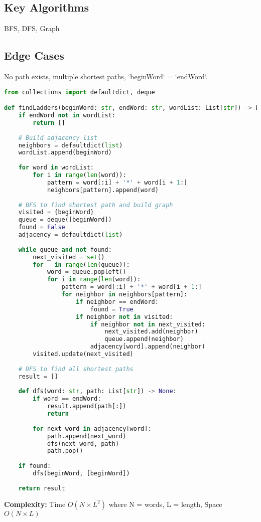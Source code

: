 \documentclass[10pt, a4paper]{article}
\begin{document}
\subsection*{Key Algorithms}
BFS, DFS, Graph

\subsection*{Edge Cases}
No path exists, multiple shortest paths, `beginWord` = `endWord`.

\begin{lstlisting}[language=Python]
from collections import defaultdict, deque

def findLadders(beginWord: str, endWord: str, wordList: List[str]) -> List[List[str]]:
    if endWord not in wordList:
        return []
    
    # Build adjacency list
    neighbors = defaultdict(list)
    wordList.append(beginWord)
    
    for word in wordList:
        for i in range(len(word)):
            pattern = word[:i] + '*' + word[i + 1:]
            neighbors[pattern].append(word)
    
    # BFS to find shortest path and build graph
    visited = {beginWord}
    queue = deque([beginWord])
    found = False
    adjacency = defaultdict(list)
    
    while queue and not found:
        next_visited = set()
        for _ in range(len(queue)):
            word = queue.popleft()
            for i in range(len(word)):
                pattern = word[:i] + '*' + word[i + 1:]
                for neighbor in neighbors[pattern]:
                    if neighbor == endWord:
                        found = True
                    if neighbor not in visited:
                        if neighbor not in next_visited:
                            next_visited.add(neighbor)
                            queue.append(neighbor)
                        adjacency[word].append(neighbor)
        visited.update(next_visited)
    
    # DFS to find all shortest paths
    result = []
    
    def dfs(word: str, path: List[str]) -> None:
        if word == endWord:
            result.append(path[:])
            return
        
        for next_word in adjacency[word]:
            path.append(next_word)
            dfs(next_word, path)
            path.pop()
    
    if found:
        dfs(beginWord, [beginWord])
    
    return result
\end{lstlisting}
\textbf{Complexity:} Time $O(N \times L^2)$ where N = words, L = length, Space $O(N \times L)$
\end{document}

